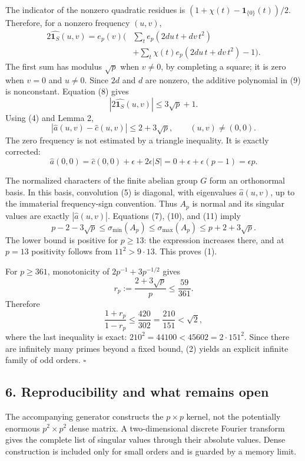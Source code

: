 \documentclass[
  11pt,
]{article}
\begin{document}
The indicator of the nonzero quadratic residues is
\((1+\chi(t)-\mathbf1_{\{0\}}(t))/2\). Therefore, for a nonzero
frequency \((u,v)\), \[
\begin{aligned}
2\widehat{\mathbf1_S}(u,v)
=e_p(v)\bigg(&\sum_t e_p(2du\,t+dv\,t^2)\\
&+\sum_t\chi(t)e_p(2du\,t+dv\,t^2)-1\bigg).
\end{aligned} \tag{9}
\] The first sum has modulus \(\sqrt p\) when \(v\ne0\), by completing a
square; it is zero when \(v=0\) and \(u\ne0\). Since \(2d\) and \(d\)
are nonzero, the additive polynomial in (9) is nonconstant. Equation (8)
gives \[
\left|2\widehat{\mathbf1_S}(u,v)\right|\leq3\sqrt p+1.
\] Using (4) and Lemma 2, \[
|\widehat a(u,v)-\widehat c(u,v)|\leq2+3\sqrt p,
\qquad (u,v)\ne(0,0). \tag{10}
\] The zero frequency is not estimated by a triangle inequality. It is
exactly corrected: \[
\widehat a(0,0)=\widehat c(0,0)+\epsilon+2\epsilon|S|
=0+\epsilon+\epsilon(p-1)=\epsilon p. \tag{11}
\]

The normalized characters of the finite abelian group \(G\) form an
orthonormal basis. In this basis, convolution (5) is diagonal, with
eigenvalues \(\widehat a(u,v)\), up to the immaterial frequency-sign
convention. Thus \(A_p\) is normal and its singular values are exactly
\(|\widehat a(u,v)|\). Equations (7), (10), and (11) imply \[
p-2-3\sqrt p\leq\sigma_{\min}(A_p)
\leq\sigma_{\max}(A_p)\leq p+2+3\sqrt p.
\] The lower bound is positive for \(p\geq13\): the expression increases
there, and at \(p=13\) positivity follows from \(11^2>9\cdot13\). This
proves (1).

For \(p\geq361\), monotonicity of \(2p^{-1}+3p^{-1/2}\) gives \[
r_p:=\frac{2+3\sqrt p}{p}\leq\frac{59}{361}.
\] Therefore \[
\frac{1+r_p}{1-r_p}\leq\frac{420}{302}
=\frac{210}{151}<\sqrt2,
\] where the last inequality is exact:
\(210^2=44100<45602=2\cdot151^2\). Since there are infinitely many
primes beyond a fixed bound, (2) yields an explicit infinite family of
odd orders. \(\square\)

\subsection{6. Reproducibility and what remains
open}\label{reproducibility-and-what-remains-open}

The accompanying generator constructs the \(p\times p\) kernel, not the
potentially enormous \(p^2\times p^2\) dense matrix. A two-dimensional
discrete Fourier transform gives the complete list of singular values
through their absolute values. Dense construction is included only for
small orders and is guarded by a memory limit.
\end{document}
